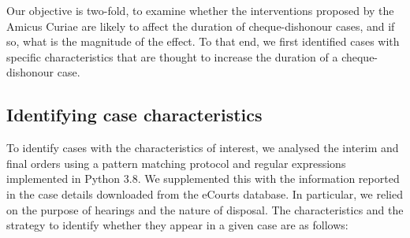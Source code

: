 
Our objective is two-fold, to examine whether the interventions proposed by the Amicus Curiae are likely to affect the duration of cheque-dishonour cases, and if so, what is the magnitude of the effect. To that end, we first identified cases with specific characteristics that are thought to increase the duration of a cheque-dishonour case. 

\subsection{Identifying case characteristics} \label{sec:text-mining}

To identify cases with the characteristics of interest, we analysed the interim and final orders using a pattern matching protocol and regular expressions implemented in Python 3.8. We supplemented this with the information reported in the case details downloaded from the eCourts database. In particular, we relied on the purpose of hearings and the nature of disposal. The characteristics and the strategy to identify whether they appear in a given case are as follows:

